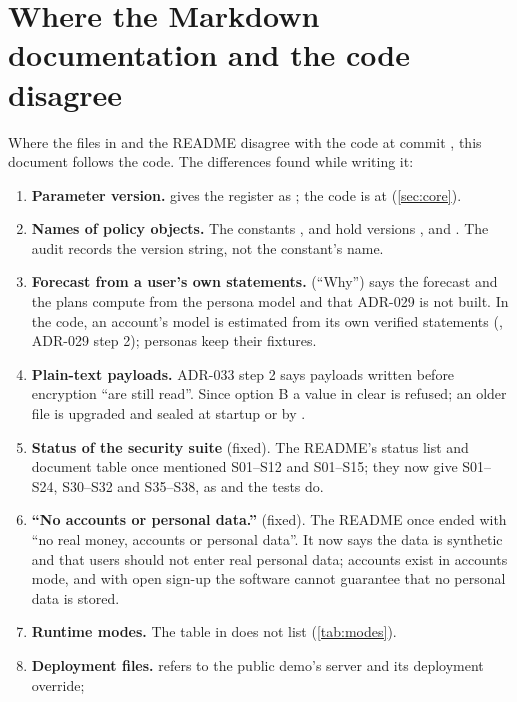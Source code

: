 \section{Where the Markdown documentation and the code disagree}\label{sec:discrepancies}

Where the files in  and the README disagree with the code at commit \texttt{\nlCommit}, this document
follows the code. The differences found while writing it:

\begin{enumerate}
  \item \textbf{Parameter version.}  gives the register as ; the code is at
     (\cref{sec:core}).
  \item \textbf{Names of policy objects.} The constants ,  and  hold versions
    ,  and . The audit records the version string, not the constant's name.
  \item \textbf{Forecast from a user's own statements.}  (``Why'') says the forecast and the plans
    compute from the persona model and that ADR-029 is not built. In the code, an account's model is estimated from its
    own verified statements (, ADR-029 step 2); personas keep their fixtures.
  \item \textbf{Plain-text payloads.} ADR-033 step 2 says payloads written before encryption ``are still read''. Since
    option B a value in clear is refused; an older file is upgraded and sealed at startup or by .
  \item \textbf{Status of the security suite} (fixed). The README's status list and document table once mentioned S01--S12
    and S01--S15; they now give S01--S24, S30--S32 and S35--S38, as  and the tests do.
  \item \textbf{``No accounts or personal data.''} (fixed). The README once ended with ``no real money, accounts or personal
    data''. It now says the data is synthetic and that users should not enter real personal data; accounts exist in
    accounts mode, and with open sign-up the software cannot guarantee that no personal data is stored.
  \item \textbf{Runtime modes.} The table in  does not list  (\cref{tab:modes}).
  \item \textbf{Deployment files.}  refers to the public demo's server and its deployment override;

\end{enumerate}
